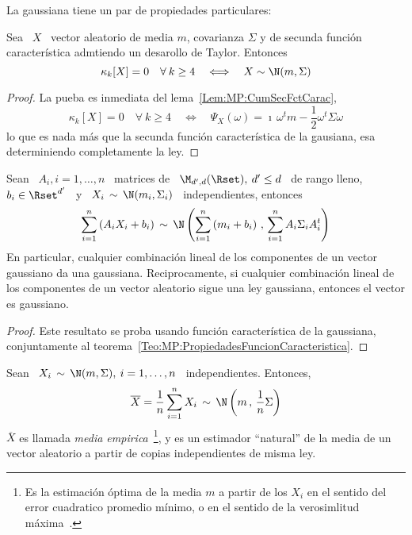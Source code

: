 La gaussiana tiene un par de propiedades particulares:
%
\begin{lema}
%
  Sea \  $X$ \ vector aleatorio de  media $m$, covarianza $\Sigma$  y de secunda
  funci\'on caracter\'istica admtiendo un desarollo de Taylor. Entonces
  \[
  \kappa_k[X] =  0 \quad \forall \: k  \ge 4 \quad \Longleftrightarrow  \quad X \sim
  \N(m,\Sigma)
  \]
\end{lema}
%
\begin{proof}
  La pueba es inmediata del lema~\ref{Lem:MP:CumSecFctCarac},
  \[
  \kappa_k[X]  =  0  \quad  \forall  \:  k \ge  4  \quad  \Longleftrightarrow  \quad
  \Psi_X(\omega) = \imath \, \omega^t m - \frac12 \omega^t \Sigma \omega
  \]
  lo que es nada m\'as que la secunda funci\'on caracter\'istica de la gausiana,
  esa determiniendo completamente la ley.
\end{proof}
%
\begin{teorema}[Stabilidad]
\label{Teo:MP:StabilidadGaussiana}
%
  Sean \ $A_i , i = 1,\ldots,n$  \ matrices de \ $\M_{d',d}(\Rset), \: d' \le d$
  \ de rango lleno, $b_i \in \Rset^{d'}$ \ y \ $X_i \, \sim \, \N(m_i,\Sigma_i)$
  \ independientes, entonces
  \[
  \sum_{i=1}^n \left(  A_i X_i  + b_i \right)  \, \sim \,  \N\left( \sum_{i=1}^n
    \left( m_i + b_i \right) \, , \, \sum_{i=1}^n A_i \Sigma_i A_i^t \right)
  \]
  En particular, cualquier combinaci\'on lineal  de los componentes de un vector
  gaussiano da una gaussiana.  Reciprocamente, si cualquier combinaci\'on lineal
  de los componentes de un vector aleatorio sigue una ley gaussiana, entonces el
  vector es gaussiano.
\end{teorema}
%
\begin{proof}
  Este  resultato se proba  usando funci\'on  caracter\'istica de  la gaussiana,
  conjuntamente al teorema~\ref{Teo:MP:PropiedadesFuncionCaracteristica}.
\end{proof}
%
\begin{corolario}\label{Cor:MP:MediaEmpiricaGauss}
%
  Sean \ $X_i \, \sim \, \N(m,\Sigma), \: i = 1, \ldots , n$ \ independientes. Entonces,
  \[
  \overline{X} =  \frac{1}{n} \sum_{i=1}^n  X_i \,  \sim \, \N\left(  m \,  , \,
    \frac{1}{n} \Sigma \right)
  \]
  $\overline{X}$  es llamada {\em  media empirica}~\footnote{Es  la estimaci\'on
    \'optima de  la media  $m$ a  partir de los  $X_i$ en  el sentido  del error
    cuadratico  promedio   m\'inimo,  o  en   el  sentido  de   la  verosimlitud
    m\'axima~\cite{Kay93, Rob07}.}, y es un estimador ``natural'' de la media de
  un vector aleatorio a partir de copias independientes de misma ley.
\end{corolario}
